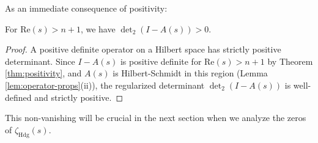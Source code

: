 As an immediate consequence of positivity:

\begin{corollary}
\label{cor:det-nonzero}
For $\text{Re}(s) > n+1$, we have $\det_2(I - A(s)) > 0$.
\end{corollary}

\begin{proof}
A positive definite operator on a Hilbert space has strictly positive determinant. Since $I - A(s)$ is positive definite for $\text{Re}(s) > n+1$ by Theorem \ref{thm:positivity}, and $A(s)$ is Hilbert-Schmidt in this region (Lemma \ref{lem:operator-props}(ii)), the regularized determinant $\det_2(I - A(s))$ is well-defined and strictly positive.
\end{proof}

This non-vanishing will be crucial in the next section when we analyze the zeros of $\zeta_{\text{Hdg}}(s)$. 